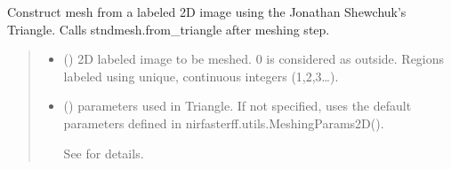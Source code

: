 \documentclass[letterpaper,10pt,english]{sphinxmanual}
\begin{document}
\begin{fulllineitems}
\begin{fulllineitems}
\label{\detokenize{_autosummary/nirfasterff.base.stnd_mesh.stndmesh:nirfasterff.base.stnd_mesh.stndmesh.from_image}}
\pysigstartsignatures
{}
\pysigstopsignatures
\sphinxAtStartPar
Construct mesh from a labeled 2D image using the Jonathan Shewchuk’s Triangle. Calls stndmesh.from\_triangle after meshing step.
\begin{quote}\begin{description}
\begin{itemize}
\item {} 
\sphinxAtStartPar
{} (\sphinxstyleliteralemphasis{\sphinxupquote{ (}}\sphinxstyleliteralemphasis{\sphinxupquote{) }}) \textendash{} 2D labeled image to be meshed. 0 is considered as outside. Regions labeled using unique, continuous integers (1,2,3…).

\item {} 
\sphinxAtStartPar
{} ({\hyperref[\detokenize{_autosummary/nirfasterff.utils.MeshingParams2D:nirfasterff.utils.MeshingParams2D}]{}}\sphinxstyleliteralemphasis{\sphinxupquote{, }}) \textendash{} 
\sphinxAtStartPar
parameters used in Triangle. If not specified, uses the default parameters defined in nirfasterff.utils.MeshingParams2D().

\sphinxAtStartPar
See {\hyperref[\detokenize{_autosummary/nirfasterff.utils.MeshingParams2D:nirfasterff.utils.MeshingParams2D}]{}} for details.



\end{itemize}
\end{description}
\end{quote}
\end{fulllineitems}
\end{fulllineitems}
\end{document}
